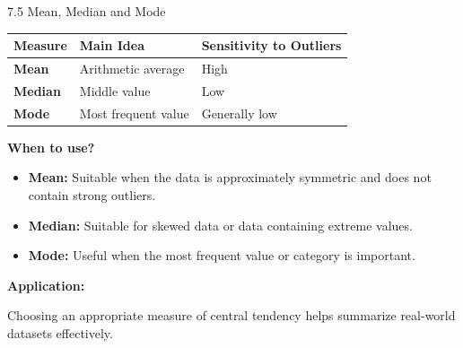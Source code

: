 \begin{frame}{7.5 Mean, Median and Mode}

\small

\begin{table}
\centering

\begin{tabular}{>{\bfseries}l l l}
\toprule
Measure & Main Idea & Sensitivity to Outliers \\
\midrule
Mean & Arithmetic average & High \\
Median & Middle value & Low \\
Mode & Most frequent value & Generally low \\
\bottomrule
\end{tabular}

\end{table}

\textbf{When to use?}

\begin{itemize}
    \item \textbf{Mean:} Suitable when the data is approximately
    symmetric and does not contain strong outliers.
    
    \item \textbf{Median:} Suitable for skewed data or data
    containing extreme values.
    
    \item \textbf{Mode:} Useful when the most frequent value or
    category is important.
\end{itemize}

\textbf{Application:}

Choosing an appropriate measure of central tendency helps
summarize real-world datasets effectively.

\end{frame}